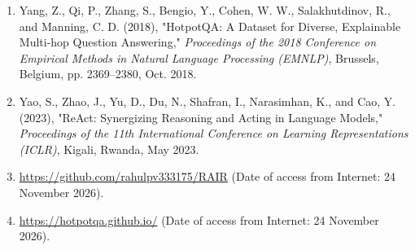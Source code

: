 \documentclass[12pt,a4paper]{report}
\begin{document}
\begin{singlespace}
\begin{enumerate}
\item Yang, Z., Qi, P., Zhang, S., Bengio, Y., Cohen, W. W., Salakhutdinov, R., and Manning, C. D. (2018), "HotpotQA: A Dataset for Diverse, Explainable Multi-hop Question Answering," \textit{Proceedings of the 2018 Conference on Empirical Methods in Natural Language Processing (EMNLP)}, Brussels, Belgium, pp. 2369--2380, Oct. 2018.

\item Yao, S., Zhao, J., Yu, D., Du, N., Shafran, I., Narasimhan, K., and Cao, Y. (2023), "ReAct: Synergizing Reasoning and Acting in Language Models," \textit{Proceedings of the 11th International Conference on Learning Representations (ICLR)}, Kigali, Rwanda, May 2023.

\item \url{https://github.com/rahulpv333175/RAIR} (Date of access from Internet: 24 November 2026).

\item \url{https://hotpotqa.github.io/} (Date of access from Internet: 24 November 2026).

\end{enumerate}
\end{singlespace}
\end{document}
